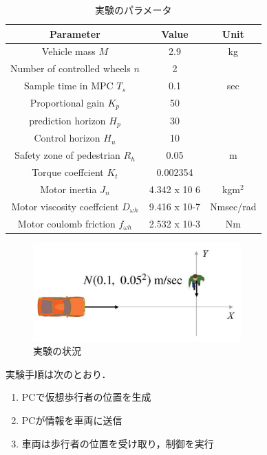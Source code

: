 \begin{table}[htbp]
    \centering
    \caption{実験のパラメータ}
    \scalebox{0.81} {
        \begin{tabular}{|c|c|c|}
            \hline
            Parameter                                 & Value        & Unit      \\ \hline
            Vehicle mass $M$                          & 2.9          & kg        \\ \hline
            Number of controlled wheels $n$           & 2            &           \\ \hline
            Sample time in MPC $T_s$                  & 0.1          & sec       \\ \hline
            Proportional gain $K_p$                   & 50           &           \\ \hline
            prediction horizon $H_p$                  & 30           &           \\ \hline
            Control horizon $H_u$                     & 10           &           \\ \hline
            Safety zone of pedestrian $R_h$           & 0.05         & m         \\ \hline
            Torque coeffcient $K_t$                   & 0.002354     &           \\ \hline
            Motor inertia $J_n$                       & 4.342 x 10 6 & kgm$^2$   \\ \hline
            Motor viscosity coeffcient $D_{\omega h}$ & 9.416 x 10-7 & Nmsec/rad \\ \hline
            Motor coulomb friction $f_{\omega h}$     & 2.532 x 10-3 & Nm        \\ \hline
        \end{tabular}
    }
\end{table}


\begin{figure}[H]
    \centering
    \includegraphics[width=8cm]{./fig/fig16.png}
    \caption{実験の状況}
\end{figure}

実験手順は次のとおり．
\begin{enumerate}
    \item PCで仮想歩行者の位置を生成
    \item PCが情報を車両に送信
    \item 車両は歩行者の位置を受け取り，制御を実行
\end{enumerate}

